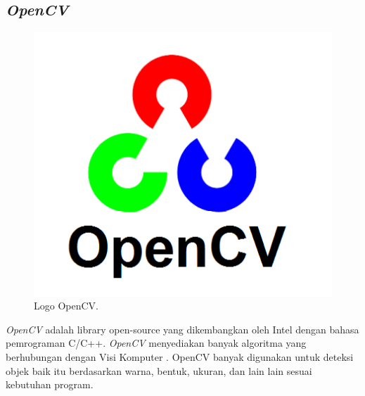 \subsection{\emph{OpenCV}}
\label{sec:opencv}
\begin{figure}[H]
    \centering
  
    \includegraphics[scale=0.40]{gambar/opencv.png}
  
    \caption{Logo OpenCV.}
    \label{fig:opencv}
\end{figure}
\emph{OpenCV} adalah library open-source yang dikembangkan oleh 
Intel dengan bahasa pemrograman C/C++. 
\emph{OpenCV} menyediakan banyak algoritma yang berhubungan dengan Visi 
Komputer \Parencite{ref_opencv}. OpenCV banyak digunakan untuk deteksi 
objek baik itu berdasarkan warna, bentuk, ukuran, dan lain lain 
sesuai kebutuhan program. 

